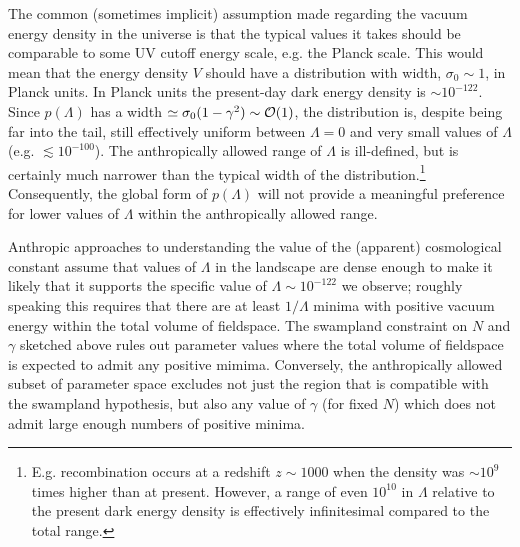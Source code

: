 \documentclass[12pt]{article}
\newcommand{\lfl}[1]{\textcolor{red}{[{\bf LL}: #1]}}
\newcommand{\SH}[1]{\textcolor{brown}{[{\bf SH}: #1]}}
\newcommand{\sh}[1]{\textcolor{brown}{#1}}
\begin{document}
%
The common (sometimes implicit) assumption made regarding the vacuum energy density in the universe is that the typical values it takes should be comparable to some UV cutoff energy scale, e.g. the Planck scale. This would mean that the energy density $V$ should have a distribution with width, $\sigma_0 \sim 1$, in Planck units. In Planck units the present-day dark energy density is $\sim 10^{-122}$. Since $p(\Lambda)$  has a width $\simeq \sigma_0 (1-\gamma^2)\sim{\cal{O}}(1)$, the distribution is, despite being far into the tail, still effectively uniform between $\Lambda=0$ and very small values of $\Lambda$ (e.g. $\lesssim 10^{-100}$). The anthropically allowed range of $\Lambda$ is ill-defined, but is certainly much narrower than the typical width of the distribution.\footnote{E.g. recombination occurs at a redshift $z\sim 1000$ when the density was $\sim 10^9$ times higher than at present. However, a range of even $10^{10}$ in $\Lambda$ relative to the present dark energy density is effectively infinitesimal compared to the total range.} Consequently, the global form of $p(\Lambda)$ will  not provide a meaningful preference for lower values of $\Lambda$ within the anthropically allowed range. 

Anthropic approaches to understanding the value of the (apparent) cosmological constant assume that values of $\Lambda$ in the landscape are  dense enough to make it likely that it supports the specific value of $\Lambda \sim 10^{-122}$ we observe; roughly speaking this requires that there are at least $1/\Lambda$ minima with positive vacuum energy within the total volume of fieldspace. The swampland constraint on $N$ and $\gamma$ sketched above rules out parameter values where the total volume of fieldspace is expected to admit any positive mimima. Conversely, the anthropically allowed subset of parameter space excludes not just the region that is compatible with the swampland hypothesis, but also any value of $\gamma$ (for fixed $N$) which does not admit large enough numbers of positive minima.
\end{document}
